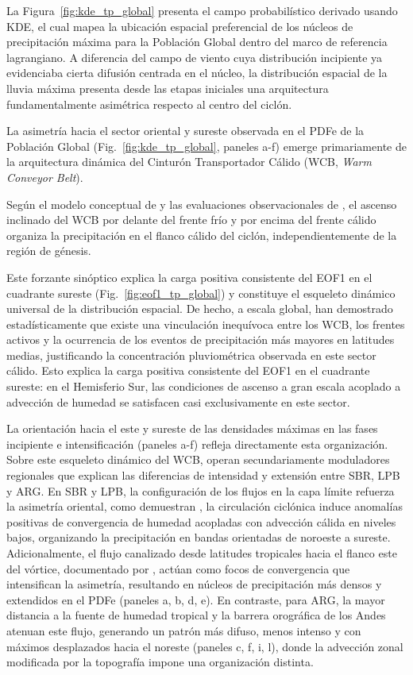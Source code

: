 La Figura~\ref{fig:kde_tp_global} presenta el campo probabilístico derivado usando KDE, el cual mapea la ubicación espacial preferencial de los núcleos de precipitación máxima para la Población Global dentro del marco de referencia lagrangiano.
A diferencia del campo de viento cuya distribución incipiente ya evidenciaba cierta difusión centrada en el núcleo, la distribución espacial de la lluvia máxima presenta desde las etapas iniciales una arquitectura fundamentalmente asimétrica respecto al centro del ciclón.

La asimetría hacia el sector oriental y sureste observada en el PDFe de la Población Global (Fig.~\ref{fig:kde_tp_global}, paneles a-f) emerge primariamente de la arquitectura dinámica del Cinturón Transportador Cálido (WCB, \textit{Warm Conveyor Belt}). 

Según el modelo conceptual de \citet{browning1986conceptual} y las evaluaciones observacionales de \citet{naud2020evaluation}, el ascenso inclinado del WCB por delante del frente frío y por encima del frente cálido organiza la precipitación en el flanco cálido del ciclón, independientemente de la región de génesis. 

Este forzante sinóptico explica la carga positiva consistente del EOF1 en el cuadrante sureste (Fig.~\ref{fig:eof1_tp_global}) y constituye el esqueleto dinámico universal de la distribución espacial. 
De hecho, a escala global, \citet{catto2015front} han demostrado estadísticamente que existe una vinculación inequívoca entre los WCB, los frentes activos y la ocurrencia de los eventos de precipitación más mayores en latitudes medias, justificando la concentración pluviométrica observada en este sector cálido. 
Esto explica la carga positiva consistente del EOF1 en el cuadrante sureste: en el Hemisferio Sur, las condiciones de ascenso a gran escala acoplado a advección de humedad se satisfacen casi exclusivamente en este sector.

La orientación hacia el este y sureste de las densidades máximas en las fases incipiente e intensificación (paneles a-f) refleja directamente esta organización.
Sobre este esqueleto dinámico del WCB, operan secundariamente moduladores regionales que explican las diferencias de intensidad y extensión entre SBR, LPB y ARG. En SBR y LPB, la configuración de los flujos en la capa límite refuerza la asimetría oriental, como demuestran \citet{cardoso2022synoptic}, la circulación ciclónica induce anomalías positivas de convergencia de humedad acopladas con advección cálida en niveles bajos, organizando la precipitación en bandas orientadas de noroeste a sureste. 
Adicionalmente, el flujo canalizado desde latitudes tropicales hacia el flanco este del vórtice, documentado por \citet{vera2002cold}, actúan como focos de convergencia que intensifican la asimetría, resultando en núcleos de precipitación más densos y extendidos en el PDFe (paneles a, b, d, e). 
En contraste, para ARG, la mayor distancia a la fuente de humedad tropical y la barrera orográfica de los Andes atenuan este flujo, generando un patrón más difuso, menos intenso y con máximos desplazados hacia el noreste (paneles c, f, i, l), donde la advección zonal modificada por la topografía impone una organización distinta.

